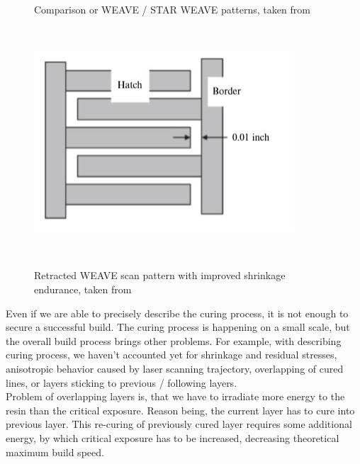 \documentclass[a4paper, twoside, 11pt]{report}
\begin{document}
\begin{figure}[!t]
\begin{minipage}[t]{0.45\textwidth}
    \caption{Comparison or WEAVE / STAR WEAVE patterns, taken from \cite[p. 88]{AMT}}
  \end{minipage}
  \\[10pt]
  \begin{minipage}[t]{\textwidth}
  \centering
  \includegraphics[scale=0.8]{retractedWeave}
  \caption{Retracted WEAVE scan pattern with improved shrinkage endurance, taken from \cite[p. 90]{AMT}}
  \end{minipage}
  \\[20pt]
\end{figure}
%
Even if we are able to precisely describe the curing process, it is not enough to secure a successful build. The curing process is happening on a small scale, but the overall build process brings other problems. For example, with describing curing process, we haven't accounted yet for shrinkage and residual stresses, anisotropic behavior caused by laser scanning trajectory, overlapping of cured lines, or layers sticking to previous / following layers.\\
Problem of overlapping layers is, that we have to irradiate more energy to the resin than the critical exposure. Reason being, the current layer has to cure into previous layer. This re-curing of previously cured layer requires some additional energy, by which critical exposure has to be increased, decreasing theoretical maximum build speed.\\
\end{document}
